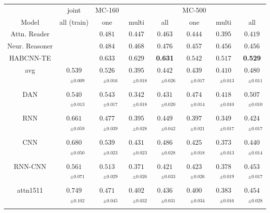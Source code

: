 \documentclass[11pt]{article}
\begin{document}
\begin{figure*}[t]
\centering
\setlength{\tabcolsep}{3pt}
\begin{tabular}{|c|c|ccc|ccc|}
\hline
& joint & MC-160     &             &            & MC-500     &      & \\
Model       & all (train)        & one & multi & all & one & multi & all \\
\hline
Attn. Reader & & $0.481$ & $0.447$ & $0.463$ & $0.444$ & $0.395$ & $0.419$ \\
Neur. Reasoner & & $0.484$ & $0.468$ & $0.476$ & $0.457$ & $0.456$ & $0.456$ \\
HABCNN-TE & & $0.633$ & $0.629$ & \textbf{0.631} & $0.542$ & $0.517$ & \textbf{0.529} \\
\hline
avg & $0.539$ & $0.526$ & $0.395$ & $0.442$ & $0.439$ & $0.410$ & $0.480$\\
 & $\quad^{\pm0.009}$ & $\quad^{\pm0.016}$ & $\quad^{\pm0.018}$ & $\quad^{\pm0.026}$ & $\quad^{\pm0.017}$ & $\quad^{\pm0.013}$ & $\quad^{\pm0.011}$\\
DAN & $0.540$ & $0.543$ & $0.342$ & $0.431$ & $0.474$ & $0.418$ & $0.507$\\
 & $\quad^{\pm0.013}$ & $\quad^{\pm0.017}$ & $\quad^{\pm0.018}$ & $\quad^{\pm0.020}$ & $\quad^{\pm0.014}$ & $\quad^{\pm0.010}$ & $\quad^{\pm0.010}$\\
\hline
RNN & $0.661$ & $0.477$ & $0.395$ & $0.449$ & $0.397$ & $0.349$ & $0.424$\\
 & $\quad^{\pm0.059}$ & $\quad^{\pm0.039}$ & $\quad^{\pm0.028}$ & $\quad^{\pm0.042}$ & $\quad^{\pm0.021}$ & $\quad^{\pm0.017}$ & $\quad^{\pm0.017}$\\
CNN & $0.680$ & $0.539$ & $0.431$ & $0.486$ & $0.425$ & $0.373$ & $0.440$\\
 & $\quad^{\pm0.050}$ & $\quad^{\pm0.023}$ & $\quad^{\pm0.023}$ & $\quad^{\pm0.028}$ & $\quad^{\pm0.018}$ & $\quad^{\pm0.013}$ & $\quad^{\pm0.014}$\\
RNN-CNN & $0.561$ & $0.513$ & $0.371$ & $0.421$ & $0.423$ & $0.378$ & $0.453$\\
 & $\quad^{\pm0.071}$ & $\quad^{\pm0.029}$ & $\quad^{\pm0.026}$ & $\quad^{\pm0.033}$ & $\quad^{\pm0.026}$ & $\quad^{\pm0.019}$ & $\quad^{\pm0.017}$\\
attn1511 & $0.749$ & $0.471$ & $0.402$ & $0.436$ & $0.400$ & $0.383$ & $0.454$\\
 & $\quad^{\pm0.102}$ & $\quad^{\pm0.045}$ & $\quad^{\pm0.032}$ & $\quad^{\pm0.031}$ & $\quad^{\pm0.034}$ & $\quad^{\pm0.016}$ & $\quad^{\pm0.028}$\\

\end{tabular}
\end{figure*}
\end{document}

